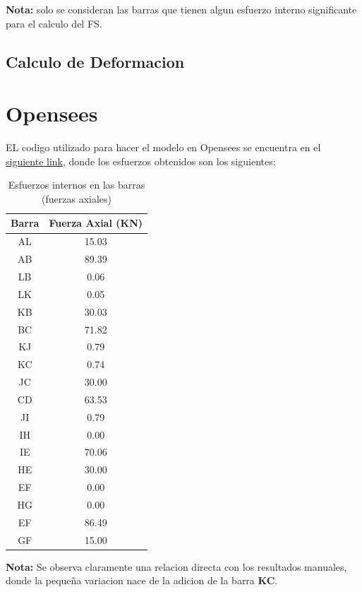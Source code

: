 \textbf{Nota:} solo se consideran las barras que tienen algun esfuerzo interno significante para el calculo del FS.


\subsection{Calculo de Deformacion}



\section{Opensees}

EL codigo utilizado para hacer el modelo en Opensees se encuentra en el \href{https://github.com/LukasWolff2002/PROYECTO_3_MCOC/blob/main/CODIGO/OPENSEES/E0_Wolff.py}{siguiente link}, donde los esfuerzos obtenidos son los siguientes:

\begin{table}[H]
    \centering
    \caption{Esfuerzos internos en las barras (fuerzas axiales)}
    \label{tab:esfuerzos_internos}
    \begin{tabular}{|c|c|}
        \hline
        \textbf{Barra} & \textbf{Fuerza Axial (KN)} \\
        \hline
        AL & 15.03 \\
        AB & 89.39 \\
        LB & 0.06  \\
        LK & 0.05  \\
        KB & 30.03 \\
        BC & 71.82 \\
        KJ & 0.79  \\
        KC & 0.74  \\
        JC & 30.00 \\
        CD & 63.53 \\
        JI & 0.79  \\
        IH & 0.00  \\
        IE & 70.06 \\
        HE & 30.00 \\
        EF & 0.00  \\
        HG & 0.00  \\
        EF & 86.49 \\
        GF & 15.00 \\ \hline
    \end{tabular}
\end{table}

\textbf{Nota:} Se observa claramente una relacion directa con los resultados manuales, donde la pequeña variacion nace de la adicion de la barra \textbf{KC}.

